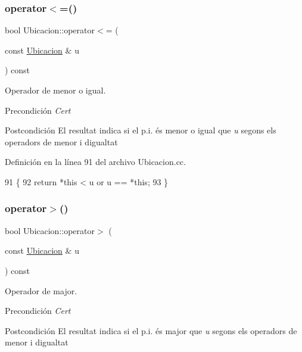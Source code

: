 \subsubsection{\texorpdfstring{operator$<$=()}{operator<=()}}
{\footnotesize\ttfamily bool Ubicacion\+::operator$<$= (\begin{DoxyParamCaption}\item[{const \hyperlink{class_ubicacion}{Ubicacion} \&}]{u }\end{DoxyParamCaption}) const}



Operador de menor o igual. 

\begin{DoxyPrecond}{Precondición}
{\itshape Cert} 
\end{DoxyPrecond}
\begin{DoxyPostcond}{Postcondición}
El resultat indica si el p.\+i. és menor o igual que {\itshape u} segons els operadors de menor i d\textquotesingle{}igualtat 
\end{DoxyPostcond}


Definición en la línea 91 del archivo Ubicacion.\+cc.


\begin{DoxyCode}
91                                                    \{
92   \textcolor{keywordflow}{return} *\textcolor{keyword}{this} < u or u == *\textcolor{keyword}{this};
93 \}
\end{DoxyCode}
\mbox{\label{class_ubicacion_abde3b350c4f55f59964fabbc17ed164f}} 
\subsubsection{\texorpdfstring{operator$>$()}{operator>()}}
{\footnotesize\ttfamily bool Ubicacion\+::operator$>$ (\begin{DoxyParamCaption}\item[{const \hyperlink{class_ubicacion}{Ubicacion} \&}]{u }\end{DoxyParamCaption}) const}



Operador de major. 

\begin{DoxyPrecond}{Precondición}
{\itshape Cert} 
\end{DoxyPrecond}
\begin{DoxyPostcond}{Postcondición}
El resultat indica si el p.\+i. és major que {\itshape u} segons els operadors de menor i d\textquotesingle{}igualtat 
\end{DoxyPostcond}


